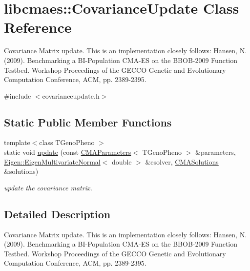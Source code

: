 \hypertarget{classlibcmaes_1_1CovarianceUpdate}{\section{libcmaes\+:\+:Covariance\+Update Class Reference}
\label{classlibcmaes_1_1CovarianceUpdate}
}


Covariance Matrix update. This is an implementation closely follows\+: Hansen, N. (2009). Benchmarking a B\+I-\/\+Population C\+M\+A-\/\+E\+S on the B\+B\+O\+B-\/2009 Function Testbed. Workshop Proceedings of the G\+E\+C\+C\+O Genetic and Evolutionary Computation Conference, A\+C\+M, pp. 2389-\/2395.  




{\ttfamily \#include $<$covarianceupdate.\+h$>$}

\subsection*{Static Public Member Functions}
\begin{DoxyCompactItemize}
\item 
{\footnotesize template$<$class T\+Geno\+Pheno $>$ }\\static void \hyperlink{classlibcmaes_1_1CovarianceUpdate_a39f58b771690547822ad54b8e89201cd}{update} (const \hyperlink{classlibcmaes_1_1CMAParameters}{C\+M\+A\+Parameters}$<$ T\+Geno\+Pheno $>$ \&parameters, \hyperlink{classEigen_1_1EigenMultivariateNormal}{Eigen\+::\+Eigen\+Multivariate\+Normal}$<$ double $>$ \&esolver, \hyperlink{classlibcmaes_1_1CMASolutions}{C\+M\+A\+Solutions} \&solutions)
\begin{DoxyCompactList}\small\item\em update the covariance matrix. \end{DoxyCompactList}\end{DoxyCompactItemize}


\subsection{Detailed Description}
Covariance Matrix update. This is an implementation closely follows\+: Hansen, N. (2009). Benchmarking a B\+I-\/\+Population C\+M\+A-\/\+E\+S on the B\+B\+O\+B-\/2009 Function Testbed. Workshop Proceedings of the G\+E\+C\+C\+O Genetic and Evolutionary Computation Conference, A\+C\+M, pp. 2389-\/2395. 

